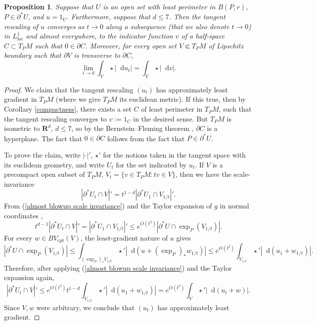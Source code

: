 \documentclass[reqno,12pt,letterpaper]{amsart}
\newcommand{\RR}{\mathbf{R}}
\newcommand*\dif{\mathop{}\!\mathrm{d}}
\newcommand{\loc}{\mathrm{loc}}
\newcommand{\cpt}{\mathrm{cpt}}
\newtheorem{proposition}[theorem]{Proposition}
\theoremstyle{definition}
\numberwithin{equation}{section}
\begin{document}
\begin{proposition}\label{blowup theorem}
Suppose that $U$ is an open set with least perimeter in $B(P, r)$, $P \in \partial^* U$, and $u = 1_U$.
Furthermore, suppose that $d \leq 7$.
Then the tangent rescaling of $u$ converges as $t \to 0$ along a subsequence (that we also denote $t \to 0$) in $L^1_\loc$ and almost everywhere, to the indicator function $v$ of a half-space $C \subset T_PM$ such that $0 \in \partial C$.
Moreover, for every open set $V \Subset T_PM$ of Lipschitz boundary such that $\partial V$ is transverse to $\partial C$,
$$\lim_{t \to 0} \int_V \star |\dif u_t| = \int_V \star |\dif v|.$$
\end{proposition}
\begin{proof}
We claim that the tangent rescaling $(u_t)$ has approximately least gradient in $T_PM$ (where we give $T_PM$ its euclidean metric). If this true, then by Corollary \ref{compactness}, there exists a set $C$ of least perimeter in $T_PM$, such that the tangent rescaling converges to $v := 1_C$ in the desired sense.
But $T_PM$ is isometric to $\RR^d$, $d \leq 7$, so by the Bernstein--Fleming theorem \cite[Theorem 17.3]{Giusti77}, $\partial C$ is a hyperplane.
The fact that $0 \in \partial C$ follows from the fact that $P \in \partial^* U$.

To prove the claim, write $|\cdot|'$, $\star'$ for the notions taken in the tangent space with its euclidean geometry, and write $U_t$ for the set indicated by $u_t$.
If $V$ is a precompact open subset of $T_PM$, $V_t = \{v \in T_PM: tv \in V\}$, then we have the scale-invariance
\begin{equation}\label{almost blowup scale invariance}
|\partial^* U_t \cap V|' = t^{1 - d}|\partial^* U_1 \cap V_{1/t}|'.
\end{equation}
From (\ref{almost blowup scale invariance}) and the Taylor expansion of $g$ in normal coordinates \cite[Lemma 3.4]{schoen1994lectures},
$$t^{d - 1} |\partial^* U_t \cap V|' = |\partial^* U_1 \cap V_{1/t}|' \leq e^{O(t^2)} |\partial^* U \cap \exp_P(V_{1/t})|.$$
For every $w \in BV_\cpt(V)$, the least-gradient nature of $u$ gives
$$|\partial^* U \cap \exp_P(V_{1/t})| \leq \int_{(\exp_P)_* V_{1/t}} \star '|\dif(u + (\exp_P)_* w_{1/t})| \leq e^{O(t^2)} \int_{V_{1/t}} \star'|\dif(u_1 + w_{1/t})|.$$
Therefore, after applying (\ref{almost blowup scale invariance}) and the Taylor expansion again,
$$|\partial^* U_t \cap V|' \leq e^{O(t^2)} t^{1 - d} \int_{V_{1/t}} \star' |\dif (u_1 + w_{1/t})| = e^{O(t^2)} \int_V \star' |\dif (u_t + w)|.$$
Since $V,w$ were arbitrary, we conclude that $(u_t)$ has approximately least gradient.
\end{proof}
\end{document}
